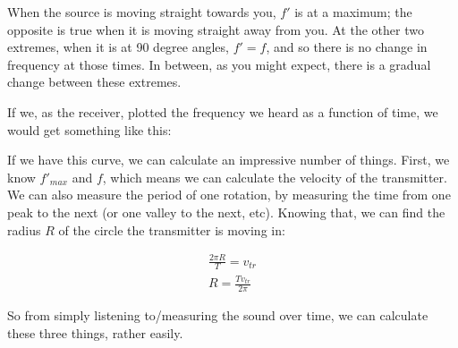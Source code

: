When the source is moving straight towards you, $f'$ is at a maximum; the opposite is true when it is moving straight away from you. At the other two extremes, when it is at 90 degree angles, $f' = f$, and so there is no change in frequency at those times. In between, as you might expect, there is a gradual change between these extremes.

If we, as the receiver, plotted the frequency we heard as a function of time, we would get something like this:

\begin{figure}[H]
  \centering
\end{figure}
 


If we have this curve, we can calculate an impressive number of things. First, we know ${f'}_{max}$ and $f$, which means we can calculate the velocity of the transmitter.\\
We can also measure the period of one rotation, by measuring the time from one peak to the next (or one valley to the next, etc). Knowing that, we can find the radius $R$ of the circle the transmitter is moving in:

\begin{align}
\frac{2 \pi R}{T} = v_{tr}\\
R = \frac{T v_{tr}}{2 \pi}
\end{align}

So from simply listening to/measuring the sound over time, we can calculate these three things, rather easily.

